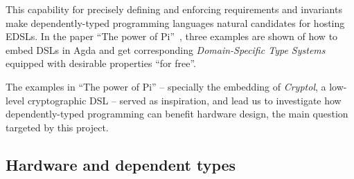             This capability for precisely defining and enforcing requirements and invariants make
            dependently-typed programming languages natural candidates for hosting \acp{EDSL}.
            In the paper ``The power of Pi''~\cite{power-pi}, three examples are shown of how to
            embed \acp{DSL} in Agda and get corresponding \emph{Domain-Specific Type Systems}
            equipped with desirable properties ``for free''.

            The examples in ``The power of Pi'' -- specially the embedding of \emph{Cryptol},
            a low-level cryptographic \ac{DSL} -- served as inspiration,
            and lead us to investigate how dependently-typed programming can benefit hardware
            design, the main question targeted by this project.



        \subsection{Hardware and dependent types}
        \label{sec:hardware-dtp}

